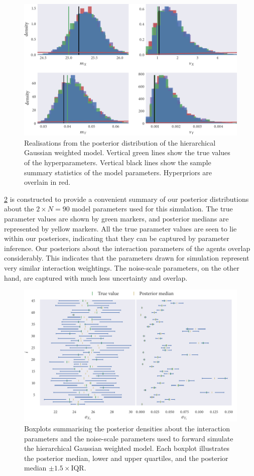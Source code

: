 \begin{figure}[tbp]
  \includegraphics{gauss/gauss_hier_hist.pdf}
  \caption{Realisations from the posterior distribution of the hierarchical
    Gaussian weighted model. Vertical green lines show the true values of the
    hyperparameters. Vertical black lines show the sample summary statistics
    of the model parameters. Hyperpriors are overlain in red.}
  \label{fig:gauss_hier_hist}
\end{figure}

\cref{fig:gauss_hier_summary} is constructed to provide a convenient summary of
our posterior distributions about the $2\times N = 90$ model parameters used
for this simulation. The true parameter values are shown by green markers, and
posterior medians are represented by yellow markers. All the true parameter
values are seen to lie within our posteriors, indicating that they can
be captured by parameter inference. Our posteriors about the interaction
parameters of the agents overlap considerably. This indicates that the
parameters drawn for simulation represent very similar interaction weightings.
The noise-scale parameters, on the other hand, are captured with much less
uncertainty and overlap.

\begin{figure}[tbp]
  \includegraphics{gauss/gauss_hier_summary.pdf}
  \caption{Boxplots summarising the posterior densities about the interaction
    parameters and the noise-scale parameters used to forward simulate the
    hierarchical Gaussian weighted model. Each boxplot illustrates the
    posterior median, lower and upper quartiles, and the posterior median
    $\pm1.5\times\text{IQR}$.}
  \label{fig:gauss_hier_summary}
\end{figure}

